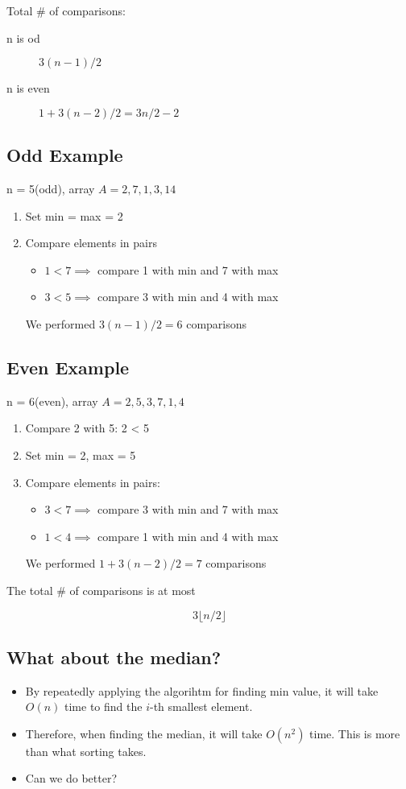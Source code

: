 \documentclass{article}
\begin{document}
Total \# of comparisons:
\begin{description}
    \item[n is od] $3(n-1)/2$
    \item [n is even] $1 + 3(n-2)/2 = 3n/2 - 2 $
\end{description}

\subsection*{Odd Example}
n = 5(odd), array $A = {2, 7, 1, 3, 14}$

\begin{enumerate}
    \item Set min = max = 2
    \item Compare elements in pairs \begin{itemize}
              \item $1 < 7 \implies $ compare 1 with min and 7 with max
              \item $3 < 5 \implies$ compare 3 with min and 4 with max
          \end{itemize}
          We performed $3(n-1)/2 = 6$ comparisons
\end{enumerate}

\subsection*{Even Example}
n = 6(even), array $A = {2, 5, 3, 7, 1, 4}$
\begin{enumerate}
    \item Compare 2 with 5: 2 < 5
    \item Set min = 2, max = 5
    \item Compare elements in pairs: \begin{itemize}
              \item $3 < 7 \implies$ compare 3 with min and 7 with max
              \item $1 < 4 \implies$ compare 1 with min and 4 with max
          \end{itemize}
          We performed $1 + 3(n-2)/2 = 7$ comparisons
\end{enumerate}

The total \# of comparisons is at most

\begin{equation*}
    3 \lfloor n / 2 \rfloor
\end{equation*}

\subsection*{What about the median?}
\begin{itemize}
    \item By repeatedly applying the algorihtm for finding min value, it will
    take $O(n)$ time to find the $i$-th smallest element.
    \item Therefore, when finding the median, it will take $O(n^2)$ time. This
    is more than what sorting takes.
    \item Can we do better?
\end{itemize}
\end{document}
